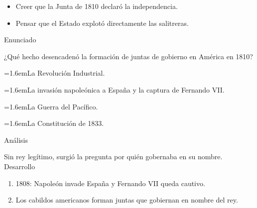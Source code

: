 \documentclass[10pt,a4paper,twocolumn]{article}
\newcommand{\alternativa}[2]{\par\noindent\hangindent=1.6em\hangafter=1\makebox[1.6em][l]{\tecla{#1}}#2\par}
\newcommand{\clave}[1]{\par\smallskip{\sffamily\footnotesize\color{esmeralda} Clave \teclaok{#1}}\par}
\begin{document}
\begin{errorfrecuente}
\begin{itemize}
  \item Creer que la Junta de 1810 declaró la independencia.
  \item Pensar que el Estado explotó directamente las salitreras.
\end{itemize}
\end{errorfrecuente}

\begin{ejemplo}
{\sffamily\footnotesize\color{zinc500} Enunciado}\par
¿Qué hecho desencadenó la formación de juntas de gobierno en América en 1810?
\alternativa{A}{La Revolución Industrial.}
\alternativa{B}{La invasión napoleónica a España y la captura de Fernando VII.}
\alternativa{C}{La Guerra del Pacífico.}
\alternativa{D}{La Constitución de 1833.}
\clave{B}
{\sffamily\footnotesize\color{zinc500} Análisis}\par Sin rey legítimo, surgió la pregunta por quién gobernaba en su nombre.
{\sffamily\footnotesize\color{zinc500} Desarrollo}
\begin{enumerate}
  \item 1808: Napoleón invade España y Fernando VII queda cautivo.
  \item Los cabildos americanos forman juntas que gobiernan en nombre del rey.
\end{enumerate}
\end{ejemplo}
\end{document}
